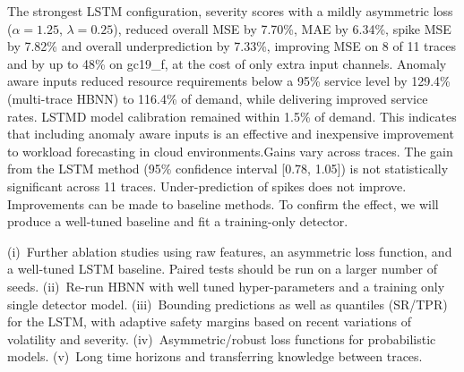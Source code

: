 \documentclass[conference]{IEEEtran}
\begin{document}
The strongest LSTM configuration, severity scores with a mildly asymmetric loss
($\alpha=1.25$, $\lambda=0.25$), reduced overall MSE by 7.70\%, MAE by 6.34\%,
spike MSE by 7.82\% and overall underprediction by 7.33\%, improving MSE on 8 of
11 traces and by up to 48\% on gc19\_f, at the cost of only extra input channels.
Anomaly aware inputs reduced resource requirements below a 95\% service level by 129.4\% (multi-trace HBNN) to 116.4\% of demand, while delivering improved service rates. LSTMD model calibration remained within 1.5\% of demand. This indicates that including anomaly aware inputs is an effective and inexpensive improvement to workload forecasting in cloud environments.Gains vary across traces. The gain from the LSTM method (95\% confidence interval [0.78, 1.05]) is not statistically significant across 11 traces. Under-prediction of spikes does not improve. Improvements can be made to baseline methods. To confirm the effect, we will produce a well-tuned baseline and fit a training-only detector. 

(i)~Further ablation studies using raw features, an asymmetric loss function, and a well-tuned LSTM baseline. Paired tests should be run on a larger number of seeds. (ii)~Re-run HBNN with well tuned hyper-parameters and a training only single detector model. (iii)~Bounding predictions as well as quantiles (SR/TPR) for the LSTM, with adaptive safety margins based on recent variations of volatility and severity. (iv)~Asymmetric/robust loss functions for probabilistic models. (v)~Long time horizons and transferring knowledge between traces.
\end{document}
